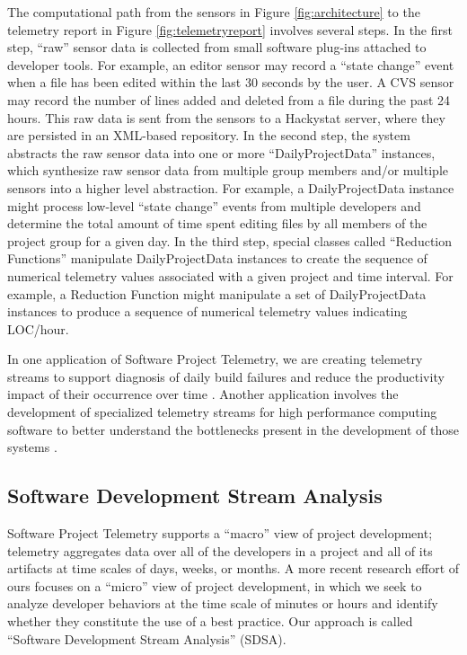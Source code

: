 The computational path from the sensors in Figure \ref{fig:architecture} to the telemetry
report in Figure \ref{fig:telemetryreport} involves several steps.  In the
first step, ``raw'' sensor data is collected from small software plug-ins
attached to developer tools. For example, an editor sensor may record a
``state change'' event when a file has been edited within the last 30
seconds by the user.  A CVS sensor may record the number of lines added and
deleted from a file during the past 24 hours.  This raw data is sent from
the sensors to a Hackystat server, where they are persisted in an XML-based
repository.  In the second step, the system abstracts the raw sensor data
into one or more ``DailyProjectData'' instances, which synthesize raw
sensor data from multiple group members and/or multiple sensors into a
higher level abstraction.  For example, a DailyProjectData instance might
process low-level ``state change'' events from multiple developers and
determine the total amount of time spent editing files by all members of
the project group for a given day.  In the third step, special classes
called ``Reduction Functions'' manipulate DailyProjectData instances to
create the sequence of numerical telemetry values
associated with a given project and time interval. For example, a Reduction
Function might manipulate a set of DailyProjectData instances to produce a
sequence of numerical telemetry values indicating LOC/hour.

In one application of Software Project Telemetry, we are
creating telemetry streams to support diagnosis of daily build failures and
reduce the productivity impact of their occurrence over time
\cite{csdl2-04-11}.  Another application involves the development of
specialized telemetry streams for high performance computing software to
better understand the bottlenecks present in the development of those
systems \cite{csdl2-04-22}.

\subsection{Software Development Stream Analysis}

Software Project Telemetry supports a ``macro'' view of project
development; telemetry aggregates data over all of the developers in a
project and all of its artifacts at time scales of days, weeks, or months.
A more recent research effort of ours focuses on a ``micro'' view of
project development, in which we seek to analyze developer behaviors at the
time scale of minutes or hours and identify whether they constitute the use
of a best practice.  Our approach is called ``Software Development Stream
Analysis'' (SDSA).

